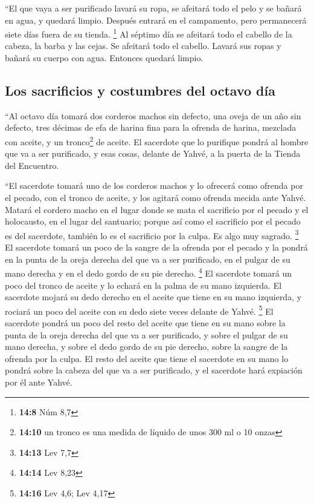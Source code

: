  ``El que vaya a ser purificado lavará su ropa, se
afeitará todo el pelo y se bañará en agua, y quedará limpio. Después
entrará en el campamento, pero permanecerá siete días fuera de su
tienda. \footnote{\textbf{14:8} Núm 8,7}  Al séptimo día
se afeitará todo el cabello de la cabeza, la barba y las cejas. Se
afeitará todo el cabello. Lavará sus ropas y bañará su cuerpo con agua.
Entonces quedará limpio.

\hypertarget{los-sacrificios-y-costumbres-del-octavo-duxeda}{%
\subsection{Los sacrificios y costumbres del octavo
día}\label{los-sacrificios-y-costumbres-del-octavo-duxeda}}

 ``Al octavo día tomará dos corderos machos sin defecto,
una oveja de un año sin defecto, tres décimas de efa de harina fina para
la ofrenda de harina, mezclada con aceite, y un tronco\footnote{\textbf{14:10}
  un tronco es una medida de líquido de unos 300 ml o 10 onzas} de
aceite.  El sacerdote que lo purifique pondrá al hombre
que va a ser purificado, y esas cosas, delante de Yahvé, a la puerta de
la Tienda del Encuentro.

 ``El sacerdote tomará uno de los corderos machos y lo
ofrecerá como ofrenda por el pecado, con el tronco de aceite, y los
agitará como ofrenda mecida ante Yahvé.  Matará el
cordero macho en el lugar donde se mata el sacrificio por el pecado y el
holocausto, en el lugar del santuario; porque así como el sacrificio por
el pecado es del sacerdote, también lo es el sacrificio por la culpa. Es
algo muy sagrado. \footnote{\textbf{14:13} Lev 7,7}  El
sacerdote tomará un poco de la sangre de la ofrenda por el pecado y la
pondrá en la punta de la oreja derecha del que va a ser purificado, en
el pulgar de su mano derecha y en el dedo gordo de su pie derecho.
\footnote{\textbf{14:14} Lev 8,23}  El sacerdote tomará
un poco del tronco de aceite y lo echará en la palma de su mano
izquierda.  El sacerdote mojará su dedo derecho en el
aceite que tiene en su mano izquierda, y rociará un poco del aceite con
su dedo siete veces delante de Yahvé. \footnote{\textbf{14:16} Lev 4,6;
  Lev 4,17}  El sacerdote pondrá un poco del resto del
aceite que tiene en su mano sobre la punta de la oreja derecha del que
va a ser purificado, y sobre el pulgar de su mano derecha, y sobre el
dedo gordo de su pie derecho, sobre la sangre de la ofrenda por la
culpa.  El resto del aceite que tiene el sacerdote en su
mano lo pondrá sobre la cabeza del que va a ser purificado, y el
sacerdote hará expiación por él ante Yahvé.

